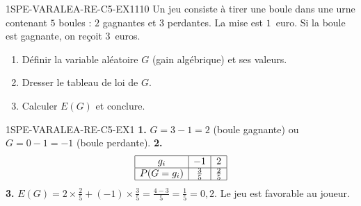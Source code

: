 
\begin{exercice}{1SPE-VARALEA-RE-C5-EX1}{1}{10}
Un jeu consiste à tirer une boule dans une urne contenant $5$ boules : $2$ gagnantes et $3$ perdantes. La mise est $1$~euro. Si la boule est gagnante, on reçoit $3$~euros.
\begin{enumerate}
  \item Définir la variable aléatoire $G$ (gain algébrique) et ses valeurs.
  \item Dresser le tableau de loi de $G$.
  \item Calculer $E(G)$ et conclure.
\end{enumerate}
\end{exercice}


\begin{corrige}{1SPE-VARALEA-RE-C5-EX1}
\textbf{1.} $G = 3-1 = 2$ (boule gagnante) ou $G = 0-1 = -1$ (boule perdante).
\textbf{2.}
\[
\begin{array}{|c|c|c|}
\hline
g_i & -1 & 2 \\
\hline
P(G=g_i) & \frac{3}{5} & \frac{2}{5} \\
\hline
\end{array}
\]
\textbf{3.} $E(G) = 2 \times \frac{2}{5} + (-1) \times \frac{3}{5} = \frac{4-3}{5} = \frac{1}{5} = 0{,}2$. Le jeu est favorable au joueur.
\end{corrige}
